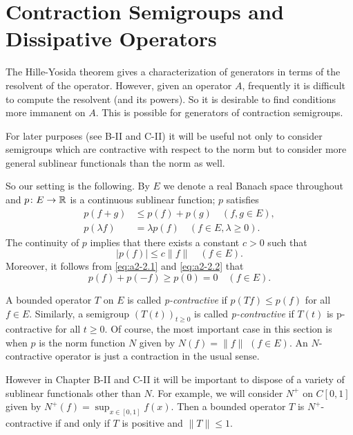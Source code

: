 \section{Contraction Semigroups and Dissipative Operators}\label{sec:a2-2}
\hspace{1cm}{\Large by Wolfgang Arendt}
\vspace{.5cm}
\newline
The Hille-Yosida theorem gives a characterization of generators in terms of the resolvent of the operator.
However, given an operator $A$, frequently it is difficult to compute the resolvent (and its powers).
So it is desirable to find conditions more immanent on $A$.
This is possible for generators of contraction semigroups.

For later purposes (see B-II and C-II) it will be useful not only to consider semigroups which are contractive with respect to the norm but to consider more general sublinear functionals than the norm as well.

So our setting is the following.
By $E$ we denote a real Banach space throughout and $p \colon E \to \mathbb{R}$ is a continuous sublinear function; \ie $p$ satisfies
\begin{align}
p(f+g) &\leq p(f) + p(g) \quad (f, g \in E), \label{eq:a2-2.1} \\
p(\lambda f) &= \lambda p(f) \quad (f \in E, \lambda \geq 0).\label{eq:a2-2.2}
\end{align}
The continuity of $p$ implies that there exists a constant $c > 0$ such that
\begin{equation}\label{eq:a2-2.3}
	|p(f)| \leq c\|f\| \quad (f \in E).
\end{equation}
Moreover, it follows from \eqref{eq:a2-2.1} and \eqref{eq:a2-2.2} that
\begin{equation}\label{eq:a2-2.4}
	p(f) + p(-f) \geq p(0) = 0 \quad (f \in E).
\end{equation}

A bounded operator $T$ on $E$ is called \emph{p-contractive} if $p(Tf) \leq p(f)$ for all $f \in E$.
Similarly, a semigroup $(T(t))_{t\geq 0}$ is called \emph{p-contractive} if $T(t)$ is p-contractive for all $t \geq 0$.
Of course, the most important case in this section is when $p$ is the norm function $N$ given by $N(f) = \|f\|$ $(f \in E)$.
An $N$-contractive operator is just a contraction in the usual sense.
\begin{remark*} \label{rem:a2-2.1-kgk}
However in Chapter B-II and C-II it will be important to dispose of a variety of sublinear functionals other than $N$.
For example, we will consider $N^{+}$ on $C[0,1]$ given by $N^{+}(f) = \sup_{x \in [0,1]} f(x)$.
Then a bounded operator $T$ is $N^{+}$-contractive if and only if $T$ is positive and $\|T\| \leq 1$.
\end{remark*}

